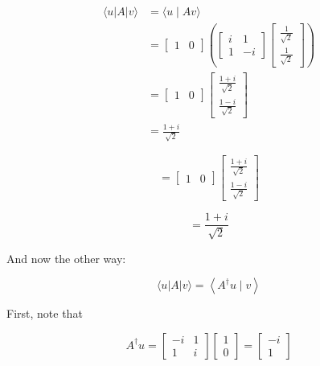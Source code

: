 \documentclass[main.tex]{subfiles}
\begin{document}
    $$
    \begin{aligned}
    \langle u|A| v\rangle &=\langle u \mid A v\rangle \\
    &=\left[\begin{array}{ll}
    1 & 0
    \end{array}\right]\left(\left[\begin{array}{cc}
    i & 1 \\
    1 & -i
    \end{array}\right]\left[\begin{array}{c}
    \frac{1}{\sqrt{2}} \\
    \frac{1}{\sqrt{2}}
    \end{array}\right]\right) \\
    &=\left[\begin{array}{ll}
    1 & 0
    \end{array}\right]\left[\begin{array}{c}
    \frac{1+i}{\sqrt{2}} \\
    \frac{1-i}{\sqrt{2}}
    \end{array}\right] \\
    &=\frac{1+i}{\sqrt{2}}
    \end{aligned}
    $$
    
    $$
    =\left[\begin{array}{ll}
    1 & 0
    \end{array}\right]\left[\begin{array}{c}
    \frac{1+i}{\sqrt{2}} \\
    \frac{1-i}{\sqrt{2}}
    \end{array}\right]
    $$
    
    $$
    =\frac{1+i}{\sqrt{2}}
    $$
    
    And now the other way:
    
    $$
    \langle u|A| v\rangle=\left\langle A^{\dagger} u \mid v\right\rangle
    $$
    
    First, note that

    $$
    A^{\dagger} u=\left[\begin{array}{cc}
    -i & 1 \\
    1 & i
    \end{array}\right]\left[\begin{array}{l}
    1 \\
    0
    \end{array}\right]=\left[\begin{array}{r}
    -i \\
    1
    \end{array}\right]
    $$
    
\end{document}

